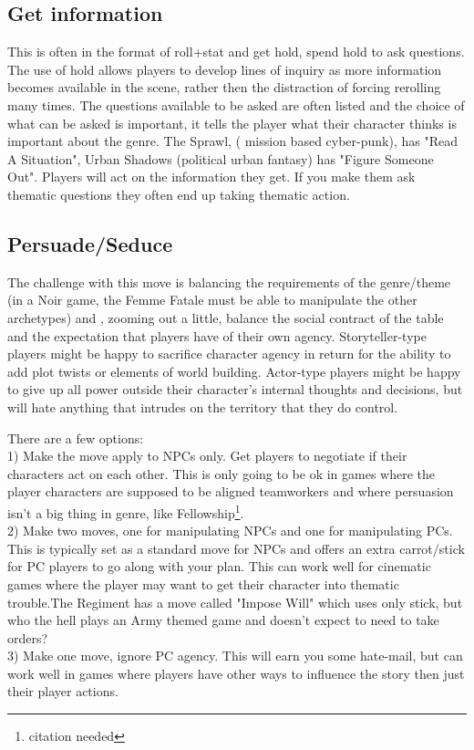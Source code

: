 \documentclass{tufte-handout}
\begin{document}
\subsection{Get information}
This is often in the format of roll+stat and get hold, spend hold to ask questions. The use of hold allows players to develop lines of inquiry as more information becomes available in the scene, rather then the distraction of forcing rerolling many times. 
The questions available to be asked are often listed and the choice of what can be asked is important, it tells the player what their character thinks is important about the genre. The Sprawl, ( mission based cyber-punk), has "Read A Situation", Urban Shadows (political urban fantasy) has "Figure Someone Out".
Players will act on the information they get. If you make them ask thematic questions they often end up taking thematic action.

\subsection{Persuade/Seduce}
The challenge with this move is  balancing the requirements of the genre/theme (in a Noir game, the Femme Fatale must be able to manipulate the other archetypes) and , zooming out a little, balance the social contract of the table and the expectation that players have of their own agency. Storyteller-type players might be happy to sacrifice character agency in return for the ability to add plot twists or elements of world building. Actor-type players might be happy to give up all power outside their character's internal thoughts and decisions, but will hate anything that intrudes on the territory that they do control.

There are a few options:\\
1) Make the move apply to NPCs only. Get players to negotiate if their characters act on each other. This is only going to be ok in games where the player characters are supposed to be aligned teamworkers and where persuasion isn't a big thing in genre, like Fellowship\footnote{citation needed}. \\
2) Make two moves, one for manipulating NPCs and one for manipulating PCs. This is typically set as a standard move for NPCs and offers an extra carrot/stick for PC players to go along with your plan. This can work well for cinematic games where the player may want to get their character into thematic trouble.The Regiment has a move called "Impose Will" which uses only stick, but who the hell plays an Army themed game and doesn't expect to need to take orders?\\
3) Make one move, ignore PC agency. This will earn you some hate-mail, but can work well in games where players have other ways to influence the story then just their player actions. 
\end{document}
